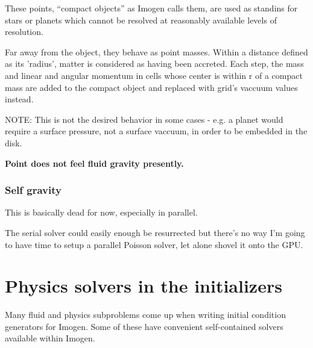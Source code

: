 \documentclass[letterpaper,12pt]{article}
\begin{document}
These points, ``compact objects'' as Imogen calls them, are used as standins for stars
or planets which cannot be resolved at reasonably available levels of resolution.

Far away from the object, they behave as point masses. Within a distance defined as
its 'radius', matter is considered as having been accreted. Each step, the mass and
linear and angular momentum in cells whose center is within r of a compact mass
are added to the compact object and replaced with grid's vaccuum values instead.

NOTE: This is not the desired behavior in some cases - e.g. a planet would require a surface
pressure, not a surface vaccuum, in order to be embedded in the disk.

\textbf{Point does not feel fluid gravity presently.}

\subsubsection{Self gravity}

This is basically dead for now, especially in parallel.

The serial solver could easily enough be resurrected but there's no way I'm going
to have time to setup a parallel Poisson solver, let alone shovel it onto the GPU.

\section{Physics solvers in the initializers}

Many fluid and physics subproblems come up when writing initial condition generators
for Imogen. Some of these have convenient self-contained solvers available within
Imogen.
\end{document}

